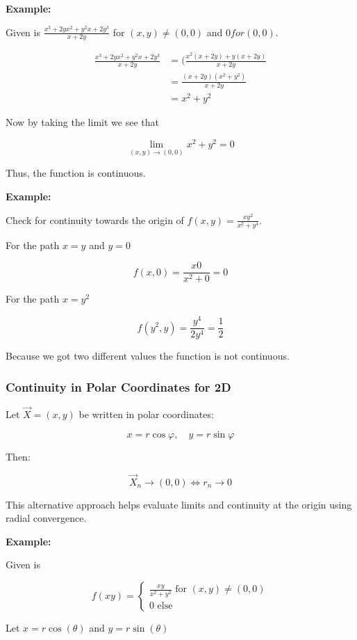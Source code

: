 \textbf{Example:}

Given is \(\frac{x^3 + 2yx^2 + y^2x + 2y^3}{x + 2y}\) for \((x,y) \ne (0,0)\) and \(0 for (0,0)\).

\begin{align*}
    \frac{x^3 + 2yx^2 + y^2x + 2y^3}{x + 2y} &= (\frac{x^2(x + 2y) + y(x + 2y)}{x + 2y}\\
    &= \frac{(x + 2y)(x^2 + y^2)}{x + 2y}\\
    &= x^2 + y^2
\end{align*}

Now by taking the limit we see that

\[
    \lim_{(x,y) \to (0,0)} x^2 + y^2 = 0
\]

Thus, the function is continuous.

\textbf{Example:}

Check for continuity towards the origin of \(f(x,y) =\frac{xy^2}{x^2 + y^4}\).

For the path \(x = y\) and \(y = 0\)

\[
    f(x,0) = \frac{x0}{x^2 + 0} = 0
\]

For the path \(x = y^2\)

\[
    f(y^2, y) = \frac{y^4}{2y^4} = \frac{1}{2}
\]

Because we got two different values the function is not continuous.

\subsubsection{Continuity in Polar Coordinates for 2D}

Let \( \vec{X} = (x, y) \) be written in polar coordinates:

\[
    x = r \cos \varphi, \quad y = r \sin \varphi
\]

Then:

\[
    \vec{X}_n \to (0, 0) \iff r_n \to 0
\]

This alternative approach helps evaluate limits and continuity at the origin using radial convergence.

\textbf{Example:}

Given is 

\[
    f(xy) = 
    \begin{cases}   
    \frac{xy}{x^2 + y^2} \text{ for } (x,y) \ne (0,0) \\ 
    0 \text{ else }
    \end{cases}
\]

Let \(x = r\cos(\theta)\) and \(y = r\sin(\theta)\)

